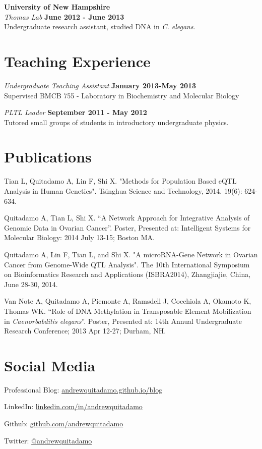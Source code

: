 \documentclass[margin,line]{res}
\begin{document}
\begin{resume}
{\bf University of New Hampshire}\\
{\em Thomas Lab} \hfill {\bf June 2012 - June 2013}\\
Undergraduate research assistant, studied DNA in {\em C. elegans}.\\ 


\section{\sc Teaching Experience}

{\em Undergraduate Teaching Assistant} \hfill {\bf January 2013-May 2013}\\
Supervised BMCB 755 - Laboratory in Biochemistry and Molecular Biology

{\em PLTL Leader} \hfill {\bf September 2011 - May 2012}\\
Tutored small groups of students in introductory undergraduate physics.

\section{\sc Publications}
Tian L, Quitadamo A, Lin F, Shi X. "Methods for Population Based eQTL Analysis in Human Genetics". Tsinghua Science and Technology, 2014. 19(6): 624-634.

Quitadamo A, Tian L, Shi X. “A Network Approach for Integrative Analysis of Genomic Data in Ovarian Cancer”. Poster, Presented at: Intelligent Systems for Molecular Biology: 2014 July 13-15; Boston MA.

Quitadamo A, Lin F, Tian L, and Shi X. "A microRNA-Gene Network in Ovarian Cancer from Genome-Wide QTL Analysis". The 10th International Symposium on Bioinformatics Research and Applications (ISBRA2014), Zhangjiajie, China, June 28-30, 2014.

Van Note A, Quitadamo A, Piemonte A, Ramsdell J, Cocchiola A, Okamoto K, Thomas WK. “Role of DNA Methylation in Transposable Element Mobilization in {\em Caenorbabditis elegans}”. Poster, Presented at: 14th Annual Undergraduate Research Conference; 2013 Apr 12-27; Durham, NH.

\section{\sc Social Media}

Professional Blog: \href{https://andrewquitadamo.github.io/blog}{andrewquitadamo.github.io/blog}

LinkedIn: \href{http://linkedin.com/in/andrewquitadamo}{linkedin.com/in/andrewquitadamo}

Github: \href{https://github.com/andrewquitadamo}{github.com/andrewquitadamo}

Twitter: \href{https://twitter.com/andrewquitadamo}{@andrewquitadamo}

\end{resume}
\end{document}
